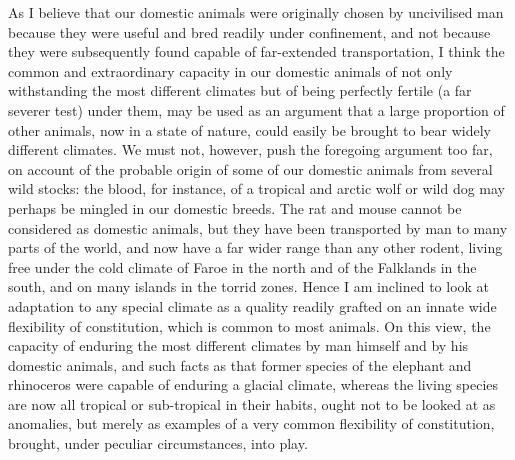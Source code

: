 \indent As I believe that our domestic animals were originally chosen by uncivilised man because they were useful and bred readily under confinement, and not because they were subsequently found capable of far-extended transportation, I think the common and extraordinary capacity in our domestic animals of not only withstanding the most different climates but of being perfectly fertile (a far severer test) under them, may be used as an argument that a large proportion of other animals, now in a state of nature, could easily be brought to bear widely different climates. We must not, however, push the foregoing argument too far, on account of the probable origin of some of our domestic animals from several wild stocks: the blood, for instance, of a tropical and arctic wolf or wild dog may perhaps be mingled in our domestic breeds. The rat and mouse cannot be considered as domestic animals, but they have been transported by man to many parts of the world, and now have a far wider range than any other rodent, living free under the cold climate of Faroe in the north and of the Falklands in the south, and on many islands in the torrid zones. Hence I am inclined to look at adaptation to any special climate as a quality readily grafted on an innate wide flexibility of constitution, which is common to most animals. On this view, the capacity of enduring the most different climates by man himself and by his domestic animals, and such facts as that former species of the elephant and rhinoceros were capable of enduring a glacial climate, whereas the living species are now all tropical or sub-tropical in their habits, ought not to be looked at as anomalies, but merely as examples of a very common flexibility of constitution, brought, under peculiar circumstances, into play.\\
